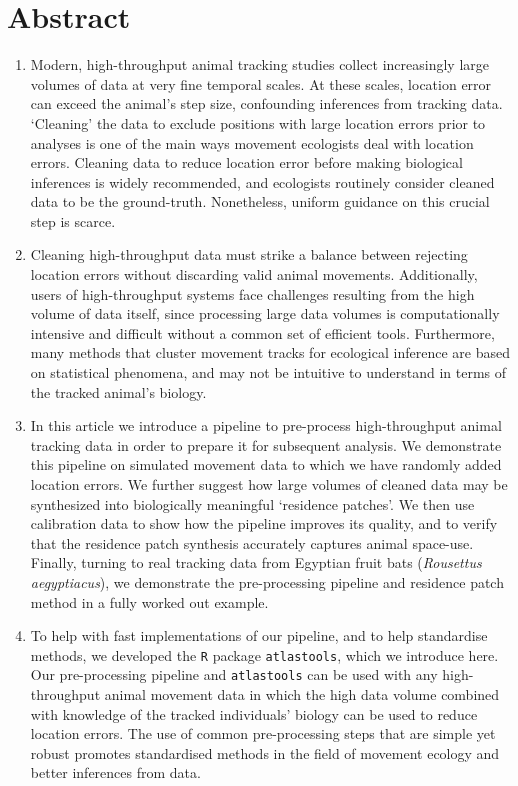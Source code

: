 \documentclass[10pt,paper=a4,headings=standardclasses
]{scrartcl}
\begin{document}
\newpage

\linenumbers

\section*{Abstract} %
\noindent
\begin{enumerate}
    \item Modern, high-throughput animal tracking studies collect increasingly large volumes of data at very fine temporal scales.
    At these scales, location error can exceed the animal's step size, confounding inferences from tracking data.
    `Cleaning' the data to exclude positions with large location errors prior to analyses is one of the main ways movement ecologists deal with location errors.
    Cleaning data to reduce location error before making biological inferences is widely recommended, and ecologists routinely consider cleaned data to be the ground-truth.
    Nonetheless, uniform guidance on this crucial step is scarce.
    
    \item Cleaning high-throughput data must strike a balance between rejecting location errors without discarding valid animal movements.
    Additionally, users of high-throughput systems face challenges resulting from the high volume of data itself, since processing large data volumes is computationally intensive and difficult without a common set of efficient tools.
    Furthermore, many methods that cluster movement tracks for ecological inference are based on statistical phenomena, and may not be intuitive to understand in terms of the tracked animal's biology.
    
    \item In this article we introduce a pipeline to pre-process high-throughput animal tracking data in order to prepare it for subsequent analysis. 
    We demonstrate this pipeline on simulated movement data to which we have randomly added location errors.
    We further suggest how large volumes of cleaned data may be synthesized into biologically meaningful ‘residence patches’.
    We then use calibration data to show how the pipeline improves its quality, and to verify that the residence patch synthesis accurately captures animal space-use.
    Finally, turning to real tracking data from Egyptian fruit bats (\textit{Rousettus aegyptiacus}), we demonstrate the pre-processing pipeline and residence patch method in a fully worked out example.
    
    \item To help with fast implementations of our pipeline, and to help standardise methods, we developed the \texttt{R} package \texttt{atlastools}, which we introduce here.
    Our pre-processing pipeline and \texttt{atlastools} can be used with any high-throughput animal movement data in which the high data volume combined with knowledge of the tracked individuals’ biology can be used to reduce location errors.
    The use of common pre-processing steps that are simple yet robust promotes standardised methods in the field of movement ecology and better inferences from data.
\end{enumerate}
\end{document}
